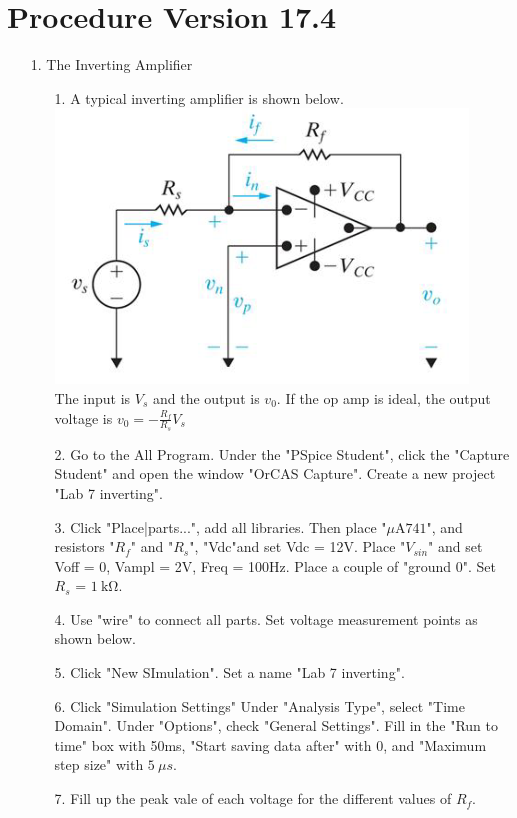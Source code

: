 \documentclass[a4paper]{article}
\begin{document}
\section*{Procedure Version 17.4}
\begin{itemize}
	\item[1.] The Inverting Amplifier
	      \begin{itemize}
	      	\item[1.] A typical inverting amplifier is shown below. \\
	      	      \includegraphics{circuit-1.png} \\ 
	      	      The input is $V_{s}$ and the output is $v_{0}$. If the op amp is ideal, the output voltage is $v_{0} = -\frac{R_{f}}{R_{s}}V_{s}$
	      	\item[2.] Go to the All Program. Under the "PSpice Student", click the "Capture Student" and open the window "OrCAS Capture". Create a new project "Lab 7 inverting".
	      	\item[3.] Click "Place|parts...", add all libraries. Then place "$\si{\mu\ampere}741$", and resistors "$R_{f}$" and "$R_{s}$", "Vdc"and set Vdc = 12V. Place "$V_{sin}$" and set Voff = 0, Vampl = 2V, Freq = 100Hz. Place a couple of "ground 0". Set $R_{s}$ = $\SI{1}{\kilo\ohm}$.
	      	\item[4.] Use "wire" to connect all parts. Set voltage measurement points as shown below.
	      	\item[5.] Click "New SImulation". Set a name "Lab 7 inverting".
	      	\item[6.] Click "Simulation Settings" Under "Analysis Type", select "Time Domain". Under "Options", check "General Settings". Fill in the "Run to time" box with 50ms, "Start saving data after" with 0, and "Maximum step size" with $\SI{5}{\mu}s$.
	      	\item[7.] Fill up the peak vale of each voltage for the different values of $R_{f}$. \\

\end{itemize}
\end{itemize}
\end{document}
